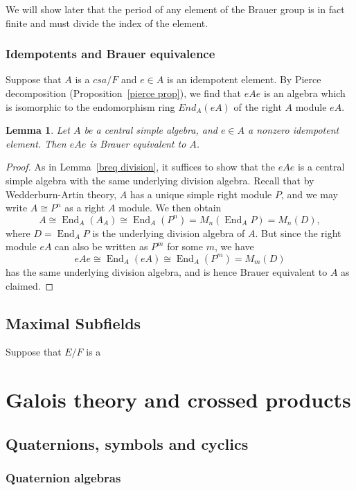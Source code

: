 \documentclass[12pt]{report}
\theoremstyle{plain}
\newtheorem{lem}[thm]{Lemma}
\newcommand{\oper}[1]{\operatorname{#1}}
\newcommand{\End}{\oper{End}}
\begin{document}
We will show later that the period of any element of the Brauer group is in
fact finite and must divide the index of the element.

\subsection{Idempotents and Brauer equivalence}

Suppose that $A$ is a $csa/F$ and $e \in A$ is an idempotent element. By
Pierce decomposition (Proposition~\ref{pierce prop}), we find that $eAe$ is
an algebra which is isomorphic to the endomorphism ring $End_A(eA)$ of the
right $A$ module $eA$.

\begin{lem}
Let $A$ be a central simple algebra, and $e \in A$ a nonzero idempotent
element. Then $eAe$ is Brauer equivalent to $A$.
\end{lem}
\begin{proof}
As in Lemma~\ref{breq division}, it suffices to show that the $eAe$ is a
central simple algebra with the same underlying division algebra. Recall
that by Wedderburn-Artin theory, $A$ has a unique simple right module $P$,
and we may write $A \cong P^n$ as a right $A$ module. We then obtain
\[A \cong \End_{A}(A_A) \cong \End_A(P^n) = M_n(\End_A P) = M_n(D),\]
where $D = \End_A P$ is the underlying division algebra of $A$. But since
the right module $eA$ can also be written as $P^m$ for some $m$, we have
\[eAe \cong \End_A(eA) \cong \End_A(P^m) = M_m(D)\]
has the same underlying division algebra, and is hence Brauer equivalent to
$A$ as claimed.
\end{proof}

\section{Maximal Subfields}

Suppose that $E/F$ is a 

\chapter{Galois theory and crossed products}

\section{Quaternions, symbols and cyclics}
\subsection{Quaternion algebras}
\end{document}
